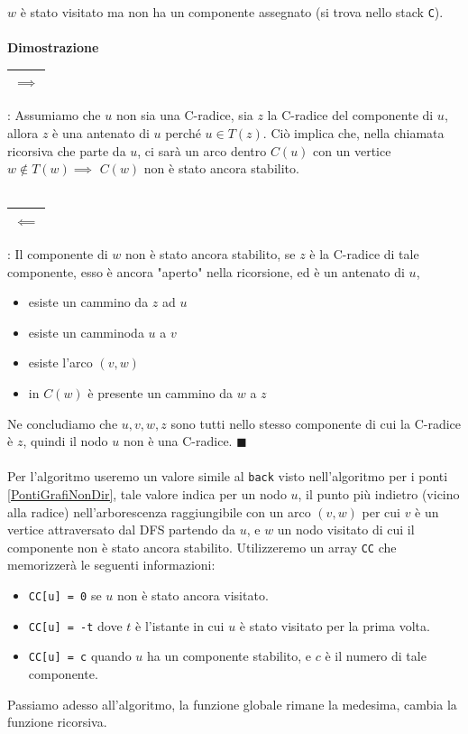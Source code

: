 \documentclass[12pt, letterpaper]{article}
\newcommand{\code}[1]{\colorbox{light-gray}{\texttt{#1}}}
\newcommand{\acc}{\\\hphantom{}\\}
\newcommand{\boxedMath}[1]{\begin{tabular}{|c|}\hline \texttt{#1} \\ \hline\end{tabular} :}
\begin{document}
$w$ è stato visitato ma non ha un componente assegnato (si trova nello stack \code{C}). \acc
\textbf{Dimostrazione} \boxedMath{$\implies$} Assumiamo che $u$ non sia una C-radice, sia $z$ la C-radice del componente
di $u$, allora $z$ è una antenato di $u$ perché $u\in T(z)$. Ciò implica che, nella chiamata ricorsiva che parte da $u$,
ci sarà un arco dentro $C(u)$ con un vertice $w\notin T(w)\implies$ $ C(w)$ non è stato ancora stabilito.
\acc\boxedMath{$\impliedby$} Il componente di $w$ non è stato ancora stabilito, se $z$ è la C-radice di tale componente, esso
è ancora "aperto" nella ricorsione, ed è un antenato di $u$, \begin{itemize}
    \item esiste un cammino da $z$ ad $u$
    \item esiste un camminoda $u$ a $v$
    \item esiste l'arco $(v,w)$
    \item in $C(w)$ è presente un cammino da $w$ a $z$
\end{itemize}
Ne concludiamo che $u,v,w,z$ sono tutti nello stesso componente di cui la C-radice è $z$, quindi il nodo $u$
non è una C-radice. $\blacksquare$\acc
Per l'algoritmo useremo un valore simile al \code{back} visto nell'algoritmo per i ponti \ref{PontiGrafiNonDir}, tale
valore indica per un nodo $u$, il punto più indietro (vicino alla radice) nell'arborescenza raggiungibile con un
arco $(v,w)$ per cui $v$ è un vertice attraversato dal DFS partendo da $u$, e $w$ un nodo visitato di cui
il componente non è stato ancora stabilito. Utilizzeremo un array \code{CC} che memorizzerà le seguenti informazioni:\begin{itemize}
    \item \code{CC[u] = 0} se $u$ non è stato ancora visitato.
    \item \code{CC[u] = -t} dove $t$ è l'istante in cui $u$ è stato visitato per la prima volta.
    \item \code{CC[u] = c} quando $u$ ha un componente stabilito, e $c$ è il numero di tale componente.
\end{itemize}
Passiamo adesso all'algoritmo, la funzione globale rimane la medesima, cambia la funzione ricorsiva.
\end{document}
